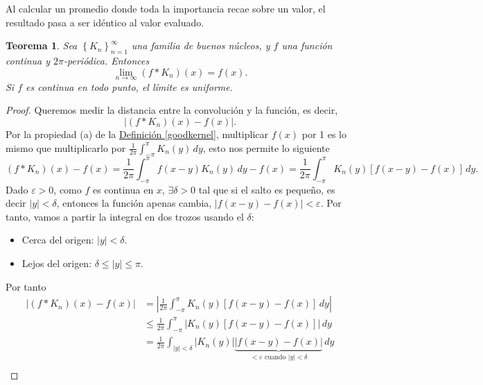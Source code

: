 \documentclass[12pt]{article}
\theoremstyle{plain}
\newtheorem{teorema}{Teorema}[section] %
\theoremstyle{definition}
\numberwithin{equation}{section}
\begin{document}
        Al calcular un promedio donde toda la importancia recae sobre un valor, el resultado pasa a ser idéntico al valor evaluado.
        \begin{teorema}
            \label{fejer}
            Sea \(\left\{K_n\right\} _{n=1}^{\infty}\) una familia de buenos núcleos, y \(f\) una función continua y \(2\pi\)-periódica. Entonces
            $$\lim_{n \to \infty} (f \ast K_n)(x) = f(x).$$ Si \(f\) es continua en todo punto, el límite es uniforme.
        \end{teorema}
        \begin{proof}
            Queremos medir la distancia entre la convolución y la función, es decir, $$\left\lvert (f \ast K_n)(x) - f(x)\right\rvert. $$ Por la propiedad (a) de la \hyperref[goodkernel]{Definición \ref*{goodkernel}}, multiplicar \(f(x)\) por 1 es lo mismo que multiplicarlo por \(\frac{1}{2\pi}\int_{-\pi}^{\pi} K_n (y)  \,dy\), esto nos permite lo siguiente
            \begin{equation*}
                (f \ast K_n)(x) - f(x) = \frac{1}{2\pi}\int_{-\pi}^{\pi} f(x-y) K_n (y)  \,dy - f(x) = \frac{1}{2\pi}\int_{-\pi}^{\pi} K_n (y) \left[f(x-y) - f(x)\right] \,dy.
            \end{equation*}
            Dado \(\varepsilon > 0\), como \(f\) es continua en \(x\), \(\exists \delta > 0\) tal que si el salto es pequeño, es decir \(|y| < \delta\), entonces la función apenas cambia, \(\left\lvert f(x-y) - f(x)\right\rvert < \varepsilon \).
            Por tanto, vamos a partir la integral en dos trozos usando el \(\delta\):
            \begin{itemize}
                \item Cerca del origen: \(|y| < \delta\).
                \item Lejos del origen: $\delta \leq |y| \leq \pi$.
            \end{itemize}
            Por tanto
            \begin{align*}
                \left\lvert (f \ast K_n)(x) - f(x)\right\rvert &= \left\lvert \frac{1}{2\pi}\int_{-\pi}^{\pi} K_n (y) \left[f(x-y) - f(x)\right] \,dy\right\rvert \\
                &\leq  \frac{1}{2\pi}\int_{-\pi}^{\pi} \left\lvert K_n (y) \left[f(x-y) - f(x)\right]\right\rvert \,dy\\
                &= \frac{1}{2\pi}\int_{|y| < \delta} \left\lvert K_n (y)\right\rvert \underbrace{\left\lvert f(x-y) - f(x)\right\rvert}_{\text{\(< \varepsilon\) cuando \(|y| < \delta\)}}     \,dy \\

\end{align*}
\end{proof}
\end{document}

